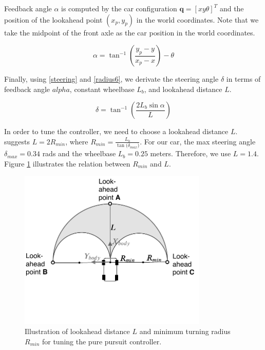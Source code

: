 Feedback angle $\alpha$ is computed by the car configuration $\textbf{q} = [x y
\theta]^T$ and the position of the lookahead point $(x_p, y_p)$ in the world
coordinates. Note that we take the midpoint of the front axle as the car
position in the world coordinates.

\begin{equation}
    \alpha = \tan^{-1}(\frac{y_p - y}{x_p - x}) - \theta
\label{eq:alpha}
\end{equation}

Finally, using \eqref{steering} and \eqref{radius6}, we derivate the steering
angle $\delta$ in terms of feedback angle $alpha$, constant wheelbase $L_b$,
and lookahead distance $L$.

\begin{equation}
    \delta = \tan^{-1}(\frac{2L_b\sin\alpha}{L})
\label{eq:delta}
\end{equation}

In order to tune the controller, we need to choose a lookahead distance $L$.
\cite{cite18} suggests $L = 2R_{min}$, where $R_{min} =
\frac{L_b}{\tan({\delta_{max})}}$. For our car, the max steering angle
$\delta_{max} = 0.34$ rads and the wheelbase $L_b = 0.25$ meters. Therefore, we
use $L = 1.4$. Figure \ref{figure:lookahead} illustrates the relation between
$R_{min}$ and $L$.


\begin{figure}[h]
  \centering
  \includegraphics[width=0.8\textwidth]{figures/pure-pursuit-lookahead.pdf}
  \caption{Illustration of lookahead distance $L$ and minimum turning radius
  $R_{min}$ for tuning the pure pursuit controller.}
  \label{figure:lookahead}
\end{figure}

